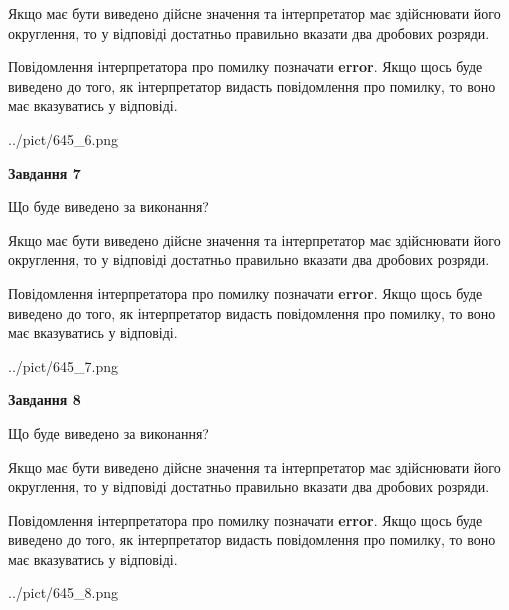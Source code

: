 \documentclass[12pt, ukrainian]{article}
\begin{document}
{\begin {Large}
Якщо має бути виведено дійсне значення та інтерпретатор має здійснювати його округлення, 
то у відповіді достатньо правильно вказати два дробових розряди.

Повідомлення інтерпретатора про помилку позначати \textbf{error}.
Якщо щось буде виведено до того, як інтерпретатор видасть повідомлення про помилку, 
то воно має вказуватись у відповіді. \par

\begin{center}
	{../pict/645_6.png}
\end{center}
\newpage

{\begin {center}\textbf{Завдання 7}\end {center}}\par
Що буде виведено за виконання? \par

Якщо має бути виведено дійсне значення та інтерпретатор має здійснювати його округлення, 
то у відповіді достатньо правильно вказати два дробових розряди.

Повідомлення інтерпретатора про помилку позначати \textbf{error}.
Якщо щось буде виведено до того, як інтерпретатор видасть повідомлення про помилку, 
то воно має вказуватись у відповіді. \par

\begin{center}
	{../pict/645_7.png}
\end{center}
\newpage

{\begin {center}\textbf{Завдання 8}\end {center}}\par
Що буде виведено за виконання? \par

Якщо має бути виведено дійсне значення та інтерпретатор має здійснювати його округлення, 
то у відповіді достатньо правильно вказати два дробових розряди.

Повідомлення інтерпретатора про помилку позначати \textbf{error}.
Якщо щось буде виведено до того, як інтерпретатор видасть повідомлення про помилку, 
то воно має вказуватись у відповіді. \par

\begin{center}
	{../pict/645_8.png}
\end{center}
\newpage


\end{Large}}
\end{document}
